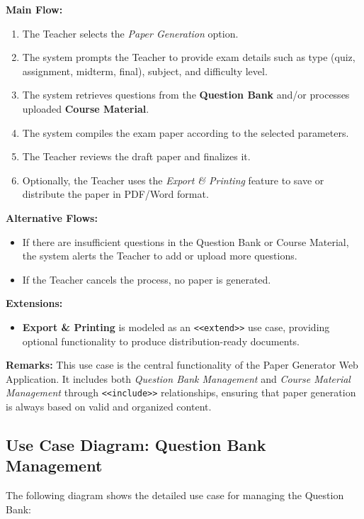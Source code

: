 \documentclass[12pt]{article}
\begin{document}
	\textbf{Main Flow:}
	\begin{enumerate}
		\item The Teacher selects the \textit{Paper Generation} option.
		\item The system prompts the Teacher to provide exam details such as type (quiz, assignment, midterm, final), subject, and difficulty level.
		\item The system retrieves questions from the \textbf{Question Bank} and/or processes uploaded \textbf{Course Material}.
		\item The system compiles the exam paper according to the selected parameters.
		\item The Teacher reviews the draft paper and finalizes it.
		\item Optionally, the Teacher uses the \textit{Export \& Printing} feature to save or distribute the paper in PDF/Word format.
	\end{enumerate}
	
	\textbf{Alternative Flows:}
	\begin{itemize}
		\item If there are insufficient questions in the Question Bank or Course Material, the system alerts the Teacher to add or upload more questions.
		\item If the Teacher cancels the process, no paper is generated.
	\end{itemize}
	
	\textbf{Extensions:}
	\begin{itemize}
		\item \textbf{Export \& Printing} is modeled as an \texttt{<<extend>>} use case, providing optional functionality to produce distribution-ready documents.
	\end{itemize}
	
	\textbf{Remarks:}  
	This use case is the central functionality of the Paper Generator Web Application. It includes both \textit{Question Bank Management} and \textit{Course Material Management} through \texttt{<<include>>} relationships, ensuring that paper generation is always based on valid and organized content.
	\newpage
	\subsection{Use Case Diagram: Question Bank Management}
	
	The following diagram shows the detailed use case for managing the Question Bank:
	
\end{document}
